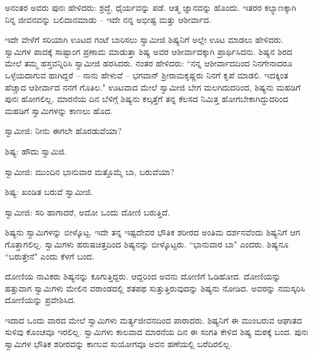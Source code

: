 ಅನಂತರ ಅವರು ಪುನಃ ಹೇಳಿದರು: ಶ್ರದ್ಧೆ, ಧೈರ್ಯವನ್ನು ಪಡೆ. ಆತ್ಮ ಜ್ಞಾನವನ್ನು ಹೊಂದು. ಇತರರ ಕಲ್ಯಾಣಕ್ಕಾಗಿ ನಿನ್ನ ಜೀವನವನ್ನು ಬಲಿದಾನಮಾಡು – ಇದೇ ನನ್ನ ಅಭೀಷ್ಟ ಮತ್ತು ಆಶೀರ್ವಾದ.

ಇದೇ ವೇಳೆಗೆ ಸರಿಯಾಗಿ ಊಟದ ಗಂಟೆ ಬಾರಿಸಲು ಸ್ವಾಮೀಜಿ ಶಿಷ್ಯನಿಗೆ ಅಲ್ಲೇ ಊಟ ಮಾಡಲು ಹೇಳಿದರು. ಸ್ವಾಮಿಗಳ ಪಾದಕ್ಕೆ ಸಾಷ್ಟಾಂಗ ಪ್ರಣಾಮ ಮಾಡುತ್ತಾ ಶಿಷ್ಯ ಅವರ ಆಶೀರ್ವಾದಕ್ಕಾಗಿ ಪ್ರಾರ್ಥಿಸಿದನು. ಶಿಷ್ಯನ ಶಿರದ ಮೇಲೆ ತಮ್ಮ ಹಸ್ತವನ್ನಿರಿಸಿ ಸ್ವಾಮೀಜಿ ಹರಸಿದರು. ನಂತರ ಹೇಳಿದರು: “ನನ್ನ ಆಶೀರ್ವಾದದಿಂದ ನಿನಗೇನಾದರೂ ಒಳ್ಳೆಯದಾಗುವ ಹಾಗಿದ್ದರೆ – ನಾನು ಹೇಳುವೆ – ಭಗವಾನ್ ಶ‍್ರೀರಾಮಕೃಷ್ಣರು ನಿನಗೆ ಕೃಪೆ ಮಾಡಲಿ. ಇದಕ್ಕಿಂತ ಹೆಚ್ಚಾದ ಆಶೀರ್ವಾದ ನನಗೆ ಗೊತಿಲ." ಊಟವಾದ ಮೇಲೆ ಸ್ವಾಮೀಜಿ ಬೇಗ ಮಲಗಿದುದರಿಂದ, ಶಿಷ್ಯನು ಮಹಡಿಗೆ ಪುನಃ ಹೋಗಲಿಲ್ಲ. ಮಾರನೆಯ ದಿನ ಬೆಳಿಗ್ಗೆ ಶಿಷ್ಯನು ಕಲ್ಕತ್ತೆಗೆ ತನ್ನ ಕೆಲಸದ ನಿಮಿತ್ತ ಹೋಗಬೇಕಾಗಿದ್ದುದರಿಂದ ಮಹಡಿಗೆ ಸ್ವಾಮಿಗಳನ್ನು ಕಾಣಲು ಹೊದ.

ಸ್ವಾಮೀಜಿ: ನೀನು ಈಗಲೇ ಹೊರಡುವೆಯಾ?

ಶಿಷ್ಯ: ಹೌದು ಸ್ವಾಮಿಜಿ.

ಸ್ವಾಮೀಜಿ: ಮುಂದಿನ ಭಾನುವಾರ ಮತ್ತೊಮ್ಮೆ ಬಾ, ಬರುವೆಯಾ?

ಶಿಷ್ಯ: ಖಂಡಿತ ಬರುವೆ ಸ್ವಾಮೀಜಿ.

ಸ್ವಾಮೀಜಿ: ಸರಿ ಹಾಗಾದರೆ, ಅದೋ ಒಂದು ದೋಣಿ ಬರುತ್ತಿದೆ.

ಶಿಷ್ಯನು ಸ್ವಾಮಿಗಳನ್ನು ಬೀಳ್ಕೊಟ್ಟ. ಇದೇ ತನ್ನ ಇಷ್ಟದೇವರ ಭೌತಿಕ ಶರೀರದ ಅಂತಿಮ ದರ್ಶನವೆಂದು ಶಿಷ್ಯನಿಗೆ ಆಗ ಗೊತ್ತಾಗಲಿಲ್ಲ. ಸ್ವಾಮಿಗಳು ಹರುಷಚಿತ್ತದಿಂದ ಶಿಷ್ಯನನ್ನು ಬೀಳ್ಕೊಟ್ಟರು. “ಭಾನುವಾರ ಬಾ" ಎಂದರು. ಶಿಷ್ಯನೂ “ಬರುತ್ತೇನೆ" ಎಂದು ಕೆಳಗೆ ಬಂದ.

ದೋಣಿಯ ನಾವಿಕರು ಶಿಷ್ಯನನ್ನು ಕೂಗುತ್ತಿದ್ದರು. ಆದ್ದರಿಂದ ಅವನು ದೋಣಿಗೆ ಓಡಿಹೋದ. ದೋಣಿಯನ್ನು ಹತ್ತುವಾಗ ಸ್ವಾಮಿಗಳು ಮೇಲಿನ ವರಾಂಡದಲ್ಲಿ ಶತಪಥ ಸುತ್ತುತ್ತಿರುವುದನ್ನು ಶಿಷ್ಯನು ನೋಡಿದ. ಅವರನ್ನು ನಮಸ್ಕರಿಸಿ ದೋಣಿಯನ್ನು ಪ್ರವೇಶಿಸಿದ.

ಇದಾದ ಒಂದು ವಾರದ ಮೇಲೆ ಸ್ವಾಮಿಗಳು ಮರ್ತ್ಯಜೀವನದಿಂದ ಪಾರಾದರು. ಶಿಷ್ಯನಿಗೆ ಈ ಮುಂಬರುವ ಆಘಾತದ ಸುಳಿವು ಕೊಂಚವೂ ಇರಲಿಲ್ಲ. ಸ್ವಾಮಿಗಳು ಕಾಲವಾದ ಮಾರನೆಯ ದಿನ ಈ ಸಂಗತಿ ಕೇಳಿದ ಶಿಷ್ಯ ಮಠಕ್ಕೆ ಬಂದ. ಪುನಃ ಸ್ವಾಮಿಗಳ ಭೌತಿಕ ಶರೀರವನ್ನು ಕಾಣುವ ಸುಯೋಗವೂ ಅವನ ಹಣೆಯಲ್ಲಿ ಬರೆದಿರಲಿಲ್ಲ.

